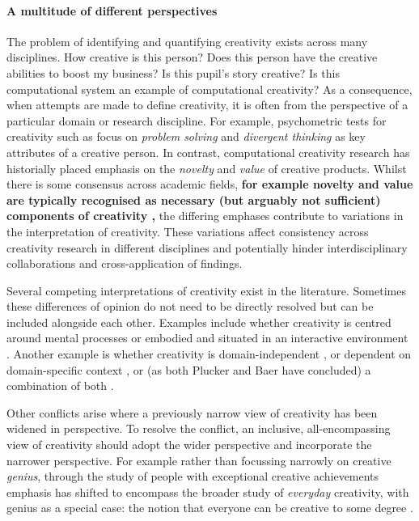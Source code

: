 \documentclass[10pt,letterpaper]{article}
\begin{document}
\paragraph{A multitude of different perspectives} \label{perspectives}

The problem of identifying and quantifying creativity exists across many disciplines. How creative is this person? Does this person have the creative abilities to boost my business? Is this pupil's story creative? Is this computational system an example of computational creativity? As a consequence, when attempts are made to define creativity, it is often from the perspective of a particular domain or research discipline. For example, psychometric tests for creativity such as \cite{guilford50,torrance74} focus on {\em problem solving} and {\em divergent thinking} as key attributes of a creative person. In contrast, computational creativity research \cite[for example]{pease01,wiggins06ngc,peinado06ngc,ritchie07} has historially placed emphasis on the {\em novelty} and {\em value} of creative products. Whilst there is some consensus across academic fields, \textbf{for example novelty and value are typically recognised as necessary (but arguably not sufficient) components of creativity \cite{mayer99},} the differing emphases contribute to variations in the interpretation of creativity. These variations affect consistency across creativity research in different disciplines and potentially hinder interdisciplinary collaborations and cross-application of findings.

Several competing interpretations of creativity exist in the literature. Sometimes these differences of opinion do not need to be directly resolved but can be included alongside each other. Examples include whether creativity is centred around mental processes \cite{boden04,dietrich10,gabora12} or embodied and situated in an interactive environment \cite{mccormack07,sosa09}. Another example is whether creativity is domain-independent \cite{plucker98}, or dependent on domain-specific context \cite{baer98}, or (as both Plucker and Baer have concluded) a combination of both \cite{plucker04,baer10}. 

Other conflicts arise where a previously narrow view of creativity has been widened in perspective. To resolve the conflict, an inclusive, all-encompassing view of creativity should adopt the wider perspective and incorporate the narrower perspective. For example rather than focussing narrowly on creative {\em genius}, through the study of people with exceptional creative achievements \cite[for example]{poincare29,hadamard45} emphasis has shifted to encompass the broader study of {\em everyday} creativity, with genius as a special case: the notion that everyone can be creative to some degree \cite{weisberg88,bryankinns09}.
\end{document}
